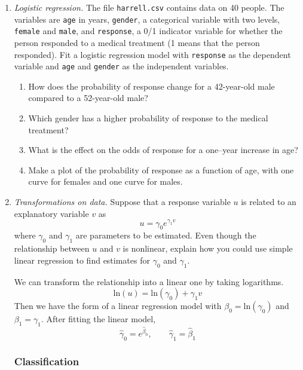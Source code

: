 \begin{enumerate}
\item \emph{Logistic regression.} The file \texttt{harrell.csv}
contains data on 40 people. The variables are \texttt{age} in years,
\texttt{gender}, a categorical variable with two levels, \texttt{female}
and \texttt{male}, and \texttt{response}, a 0/1 indicator variable for
whether the person responded to a medical treatment (1 means that the
person responded). Fit a logistic regression model with
\texttt{response} as the dependent variable and \texttt{age} and
\texttt{gender} as the independent variables.

\begin{enumerate}
\item How does the probability of response change for a 42-year-old male
compared to a 52-year-old male?
\item Which gender has a higher probability of response to the medical
treatment?
\item What is the effect on the odds of response for a one--year
increase in age?
\item Make a plot of the probability of response as a function
of age, with one curve for females and one curve for males.
\end{enumerate}

\item \emph{Transformations on data.}
  Suppose that a response variable $u$ is related to an explanatory variable $v$ as
\[
u = \gamma_0e^{\gamma_1v}
\]
where $\gamma_0$ and $\gamma_1$ are parameters to be estimated.  Even
though the relationship between $u$ and $v$ is nonlinear, explain how
you could use simple linear regression to find estimates for
$\gamma_0$ and $\gamma_1$.

\begin{solution}
\bs
We can transform the relationship into a linear one
by taking logarithms.
\[
\text{ln}(u) = \text{ln}(\gamma_0) + \gamma_1v
\]
Then we have the form of a linear regression model with $\beta_0 = \text{ln}(\gamma_0)$
and $\beta_1 = \gamma_1$. After fitting the linear model,
\[
\hat{\gamma}_0=e^{\hat{\beta}_0}, \qquad \hat{\gamma}_1 = \hat{\beta}_1
\]
\end{solution}

\subsubsection*{Classification}


\end{enumerate}
